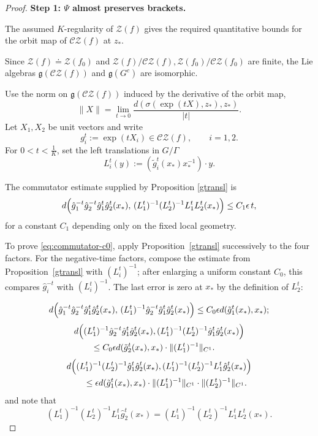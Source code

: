\documentclass[11pt]{amsart}
\numberwithin{equation}{section}
\newcommand{\CZ}{\mathcal{CZ}}
\theoremstyle{plain}
\begin{document}
\begin{proof}

{ \textbf{Step 1: $\Psi$ almost preserves brackets.}
}

The assumed $K$-regularity of $\mathcal Z(f)$  gives the required
quantitative bounds for the orbit map of $\CZ(f)$  at $z_\ast$.

Since $\mathcal Z(f)\doteq \mathcal Z(f_0)$ and $\mathcal{Z}(f)/\CZ(f),\mathcal{Z}(f_0)/\CZ(f_0)$ are finite, the Lie algebras  $\mathfrak g(\CZ(f))$ and $\mathfrak{g}(G^c)$ are isomorphic.

 Use the norm  on $\mathfrak g(\CZ(f))$ induced by the  derivative of  the
orbit map,
 \[
 \|X\|=\lim_{t\to0}
 \frac{d(\sigma(\exp(tX),z_\ast),z_\ast)}{|t|}.
\]
Let  $X_1,X_2$ be unit vectors and  write
\[
g_i^t:=\exp(tX_i)\in \CZ(f),\qquad i=1,2.
\]
 For $0<t<\frac{1}{K}$, set
the left translations in $G/\Gamma$ 
 \[
L_i^t(y):=(\tilde g_i^t(x_\ast)x_\ast^{-1})\cdot y.
\]

The commutator estimate supplied by Proposition \ref{gtransl} is
\begin{equation}\label{eq:commutator-c0}
d\Bigl(\hat g_1^{-t}\hat g_2^{-t}\hat g_1^t\hat g_2^t(x_\ast),\,
(L_1^t)^{-1}(L_2^t)^{-1}L_1^tL_2^t(x_\ast)\Bigr)
\le C_1\epsilon\,t,
\end{equation}
for  a constant $C_1$ depending only on the fixed  local geometry.

To prove \eqref{eq:commutator-c0}, apply Proposition~\ref{gtransl}
successively to the four factors.  For the negative-time
factors, compose the estimate from Proposition~\ref{gtransl} with
$(L_i^t)^{-1}$; after enlarging a uniform constant $C_0$, this compares
$\hat g_i^{-t}$ with $(L_i^t)^{-1}$.  The last error is zero at
$x_\ast$ by the definition of $L_2^t$:

$$d\Bigl(\hat g_1^{-t}\hat g_2^{-t}\hat g_1^t\hat g_2^t(x_\ast),\,
(L_1^t)^{-1}\hat g_2^{-t}\hat g_1^t\hat g_2^t(x_\ast)\Bigr)
\le C_0\epsilon d(\tilde g_1^t(x_\ast),x_\ast);$$
\begin{align*}
&d\Bigl((L_1^t)^{-1}\hat g_2^{-t}\hat g_1^t\hat g_2^t(x_\ast),
(L_1^t)^{-1}(L_2^t)^{-1}\hat g_1^t\hat g_2^t(x_\ast)\Bigr)\\
&\qquad\le C_0\epsilon d(\tilde g_2^t(x_\ast),x_\ast)
 \cdot \|(L_1^t)^{-1}\|_{C^1}.
\end{align*}
\begin{align*}
&d\Bigl((L_1^t)^{-1}(L_2^t)^{-1}\hat g_1^t\hat g_2^t(x_\ast),
 (L_1^t)^{-1}(L_2^t)^{-1}L_1^t\hat g_2^t(x_\ast)\Bigr)\\
&\qquad\le \epsilon d(\tilde g_1^t(x_\ast),x_\ast)
 \cdot \|(L_1^t)^{-1}\|_{C^1}\cdot \|(L_2^t)^{-1}\|_{C^1}.
\end{align*}
and note that
 $$(L_1^t)^{-1} (L_2^t)^{-1}  L_1^t\hat g_2^t(x_\ast)=(L_1^t)^{-1}(L_2^t)^{-1} L_1^t L_2^t(x_\ast).$$


\end{proof}
\end{document}
